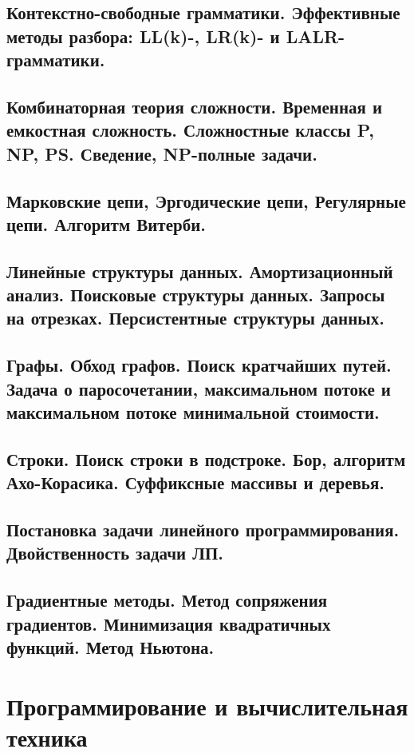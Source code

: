 \documentclass{article}
\begin{document}
\subsection{Контекстно-свободные грамматики. Эффективные методы разбора: LL(k)-, LR(k)- и LALR-грамматики.}

\subsection{Комбинаторная теория сложности. Временная и емкостная сложность. Сложностные классы P, NP, PS. Сведение, NP-полные задачи.}

\subsection{Марковские цепи, Эргодические цепи, Регулярные цепи. Алгоритм Витерби.}

\subsection{Линейные структуры данных. Амортизационный анализ. Поисковые структуры данных. Запросы на отрезках. Персистентные структуры данных.}

\subsection{Графы. Обход графов. Поиск кратчайших путей. Задача о паросочетании, максимальном потоке и максимальном потоке минимальной стоимости.}

\subsection{Строки. Поиск строки в подстроке. Бор, алгоритм Ахо-Корасика. Суффиксные массивы и деревья.}

\subsection{Постановка задачи линейного программирования. Двойственность задачи ЛП.}

\subsection{Градиентные методы. Метод сопряжения градиентов. Минимизация квадратичных функций. Метод Ньютона.}

\newpage

\section{Программирование и вычислительная техника}
\end{document}
